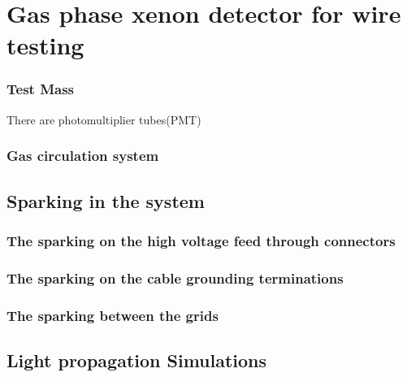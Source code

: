 \label{Chapter10}
\chapter{Gas phase xenon detector for wire testing}



\subsection{Test Mass}
There are  photomultiplier tubes(PMT)

\bigskip

\noindent




\subsection{Gas circulation system}
 

\section{Sparking in the system}


\subsection{The sparking on the high voltage feed through connectors}

\subsection{The sparking on the cable grounding terminations}

\subsection{The sparking between the grids}


\section{Light propagation Simulations}
